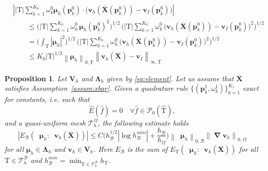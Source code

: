 \documentclass[10pt,a4paper]{amsart}
\newtheorem{prop}{Proposition}
\newcommand\B{\mathcal B} %
\DeclareMathOperator*{\Grad}{\boldsymbol\nabla}
\newcommand\LL{{\boldsymbol{\Lambda}}} %
\newcommand\Pcal{\mathcal{P}}
\newcommand\T{\mathcal{T}} %
\newcommand\Vline{\mathbf{V}} %
\newcommand\X{\mathbf{X}} %
\newcommand\Xbar{\overline{\X}} %
\newcommand{\abs}[1]{\left\lvert#1\right\rvert}
\DeclareMathOperator{\grads}{\boldsymbol\nabla_s}
\newcommand\mmu{{\boldsymbol\mu}} %
\newcommand{\norm}[1]{\left\lVert#1\right\rVert}
\newcommand\quadnode{\mathbf{p}}
\newcommand\quadweigth{\omega}
\newcommand\reftri{\widehat{\tri}} %
\newcommand\tri{\mathrm{T}} %
\renewcommand\v{\mathbf{v}} %
\begin{document}
		\begin{equation}\label{eq:3rd_part1_l2}
			\begin{aligned}
				&\abs{\abs{\tri} \sum_{k=1}^{K_0}\quadweigth_k^0 \mmu_h(\quadnode_k^0)\cdot
					\big(\v_h(\Xbar(\quadnode_k^0))-\v_I(\quadnode_k^0)\big)}\\
				&\qquad \le \bigg(\abs{\tri}
				\sum_{k=1}^{K_0}\quadweigth_k^0\,\mmu_h(\quadnode_k^0)^2 \bigg)^{1/2} \,
				\bigg(\abs{\tri}
				\sum_{k=1}^{K_0}\quadweigth_k^0\,
				\big(\v_h(\Xbar(\quadnode_k^0))-\v_I(\quadnode_k^0)\big)^2\bigg)^{1/2}\\
				&\qquad =\bigg(\int_\tri \abs{\mmu_h}^2\bigg)^{1/2}\, \bigg(\abs{\tri}
				\sum_{k=1}^{K_0}\quadweigth_k^0\,
				\big(\v_h(\Xbar(\quadnode_k^0))-\v_I(\quadnode_k^0)\big)^2\bigg)^{1/2}\\
				&\qquad \le K_0\abs{\tri}^{1/2}\norm{\mmu_h}_{0,\tri}
				\norm{\v_h(\Xbar)-\v_I}_{\infty,\tri}
			\end{aligned}
		\end{equation}

	\begin{prop}\label{prop:l2grad_estimate}
		Let $\Vline_h$ and $\LL_h$ given by \eqref{eq:element}. Let us assume that $\Xbar$ satisfies Assumption~\ref{assum:xbar}.
		Given a quadrature rule $\{(\quadnode_k^1,\quadweigth_k^1)\}_{k=1}^{K_1}$ exact for constants, i.e. such that
		\begin{equation}
			\widehat{E}(\widehat{f}) = 0
			\quad\forall\widehat{f}\in\Pcal_0(\reftri),
		\end{equation}
		and a  quasi-uniform mesh  $\T_h^\Omega$, the following estimate holds
		\begin{equation}\label{eq:h1_quad_error}
			\abs{E_\B(\grads\mmu_h:\grads\v_h(\Xbar))}
			\le
			C\bigg( h_\B^{1/2}|\log h_\B^{min}| + \frac{h_\B}{h_\Omega} \bigg)
			\norm{\grads \mmu_h}_{0,\B}\norm{\Grad\v_h}_{0,\Omega}
		\end{equation}
		for all $\mmu_h\in\LL_h$ and $\v_h\in\Vline_h$. Here $E_\B$ is the sum of $E_\tri(\grads\mmu_h:\grads\v_h(\Xbar))$ for all $\tri\in\T_h^\B$ and  $h_\B^{min}=\min_{\tri\in\T_h^\B} h_\tri$. 
	\end{prop}
\end{document}
